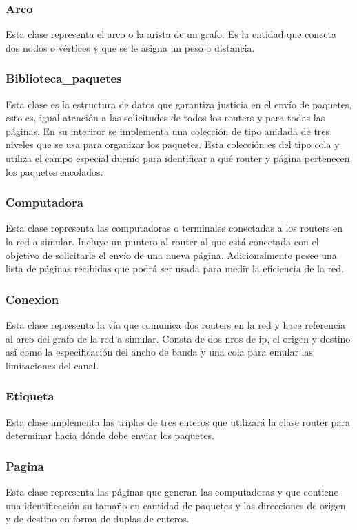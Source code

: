 \documentclass[12pt]{article} %
\begin{document}
\subsubsection{Arco}
Esta clase representa el arco o la arista de un grafo. Es la entidad que conecta dos nodos o vértices y que se le asigna un peso o distancia.
\subsubsection{Biblioteca\_paquetes}
Esta clase es la estructura de datos que garantiza justicia en el envío de paquetes, esto es, igual atención a las solicitudes de todos los routers y para todas las páginas. En su interiror se implementa una colección de tipo anidada de tres niveles que se usa para organizar los paquetes. Esta colección es del tipo cola y utiliza el campo especial duenio para identificar a qué router y página pertenecen los paquetes encolados.
\subsubsection{Computadora}
Esta clase representa las computadoras o terminales conectadas a los routers en la red a simular. Incluye un puntero al router al que está conectada con el objetivo de solicitarle el envío de una nueva página. Adicionalmente posee una lista de páginas recibidas que podrá ser usada para medir la eficiencia de la red.
\subsubsection{Conexion}
Esta clase representa la vía que comunica dos routers en la red y hace referencia al arco del grafo de la red a simular. Consta de dos nros de ip, el origen y destino así como la especificación del ancho de banda y una cola para emular las limitaciones del canal. 
\subsubsection{Etiqueta}
Esta clase implementa las triplas de tres enteros que utilizará la clase router para determinar hacia dónde debe enviar los paquetes.
\subsubsection{Pagina}
Esta clase representa las páginas que generan las computadoras y que contiene una identificación su tamaño en cantidad de paquetes y las direcciones de origen y de destino en forma de duplas de enteros.
\end{document}
